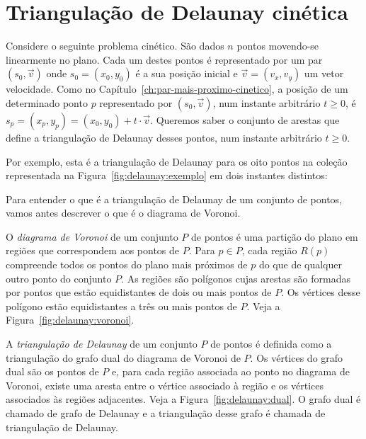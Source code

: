 

\chapter{Triangulação de Delaunay cinética}\label{ch:triangulacao-de-delaunay-cinetica}


Considere o seguinte problema cinético.
São dados $n$ pontos movendo-se linearmente no plano.
Cada um destes pontos é representado por um par $(s_0, \vec{v})$ onde $s_0 = (x_0, y_0)$ é a sua
posição inicial e $\vec{v} = (v_x, v_y)$ um vetor velocidade.
Como no Capítulo~\ref{ch:par-mais-proximo-cinetico}, a posição de um determinado ponto $p$ representado por $(s_0, \vec{v})$, num instante arbitrário $t \geq 0$, é $s_p = (x_p, y_p) = (x_0,
y_0)+t\cdot \vec{v}$.
Queremos saber o conjunto de arestas que define a triangulação de Delaunay desses pontos, num
instante arbitrário $t \geq 0$.

Por exemplo, esta é a triangulação de Delaunay para os oito pontos na coleção representada na
Figura~\ref{fig:delaunay:exemplo} em dois instantes distintos:



Para entender o que é a triangulação de Delaunay de um conjunto de pontos, vamos antes descrever o
que é o diagrama de Voronoi.

O \textit{diagrama de Voronoi} de um conjunto $P$ de pontos é uma partição do plano em regiões que
correspondem aos pontos de $P$.
Para $p \in P$, cada região $R(p)$ compreende todos os pontos do plano mais próximos de $p$ do que
de qualquer outro ponto do conjunto $P$.
As regiões são polígonos cujas arestas são formadas por pontos que estão equidistantes de dois ou
mais pontos de $P$.
Os vértices desse polígono estão equidistantes a três ou mais pontos de $P$.
Veja a Figura~\ref{fig:delaunay:voronoi}.



A \textit{triangulação de Delaunay} de um conjunto $P$ de pontos é definida como a triangulação do
grafo dual do diagrama de Voronoi de $P$.
Os vértices do grafo dual são os pontos de $P$ e, para cada região associada ao ponto no diagrama
de Voronoi, existe uma aresta entre o vértice associado à região e os vértices associados às
regiões adjacentes.
Veja a Figura~\ref{fig:delaunay:dual}.
O grafo dual é chamado de grafo de Delaunay e a triangulação desse grafo é chamada de triangulação
de Delaunay.

